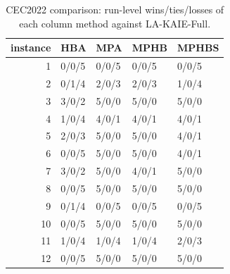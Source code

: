 \begin{table}[t]
\centering
\scriptsize
\caption{CEC2022 comparison: run-level wins/ties/losses of each column method against LA-KAIE-Full.}
\label{tab:cec2022_comparison_wtl}
\begin{tabular}{rllll}
\toprule
instance & HBA & MPA & MPHB & MPHBS \\
\midrule
1 & 0/0/5 & 0/0/5 & 0/0/5 & 0/0/5 \\
2 & 0/1/4 & 2/0/3 & 2/0/3 & 1/0/4 \\
3 & 3/0/2 & 5/0/0 & 5/0/0 & 5/0/0 \\
4 & 1/0/4 & 4/0/1 & 4/0/1 & 4/0/1 \\
5 & 2/0/3 & 5/0/0 & 5/0/0 & 4/0/1 \\
6 & 0/0/5 & 5/0/0 & 5/0/0 & 4/0/1 \\
7 & 3/0/2 & 5/0/0 & 4/0/1 & 5/0/0 \\
8 & 0/0/5 & 5/0/0 & 5/0/0 & 5/0/0 \\
9 & 0/1/4 & 0/0/5 & 0/0/5 & 0/0/5 \\
10 & 0/0/5 & 5/0/0 & 5/0/0 & 5/0/0 \\
11 & 1/0/4 & 1/0/4 & 1/0/4 & 2/0/3 \\
12 & 0/0/5 & 5/0/0 & 5/0/0 & 5/0/0 \\
\bottomrule
\end{tabular}
\end{table}
